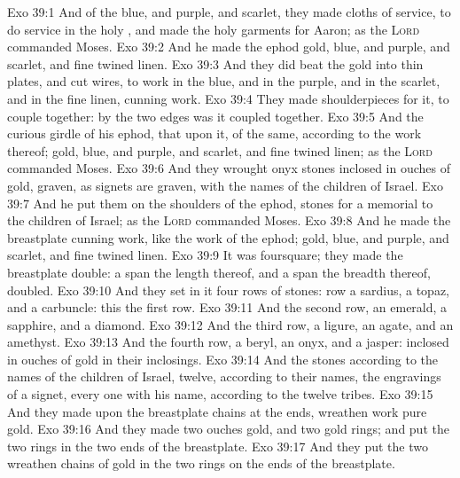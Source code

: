 \vs Exo 39:1 And of the blue, and purple, and scarlet, they made cloths of service, to do service in the holy , and made the holy garments for Aaron; as the \textsc{Lord} commanded Moses.
\vs Exo 39:2 And he made the ephod  gold, blue, and purple, and scarlet, and fine twined linen.
\vs Exo 39:3 And they did beat the gold into thin plates, and cut  wires, to work  in the blue, and in the purple, and in the scarlet, and in the fine linen,  cunning work.
\vs Exo 39:4 They made shoulderpieces for it, to couple  together: by the two edges was it coupled together.
\vs Exo 39:5 And the curious girdle of his ephod, that  upon it,  of the same, according to the work thereof;  gold, blue, and purple, and scarlet, and fine twined linen; as the \textsc{Lord} commanded Moses.
\vs Exo 39:6 And they wrought onyx stones inclosed in ouches of gold, graven, as signets are graven, with the names of the children of Israel.
\vs Exo 39:7 And he put them on the shoulders of the ephod,  stones for a memorial to the children of Israel; as the \textsc{Lord} commanded Moses.
\vs Exo 39:8 And he made the breastplate  cunning work, like the work of the ephod;  gold, blue, and purple, and scarlet, and fine twined linen.
\vs Exo 39:9 It was foursquare; they made the breastplate double: a span  the length thereof, and a span the breadth thereof,  doubled.
\vs Exo 39:10 And they set in it four rows of stones:  row  a sardius, a topaz, and a carbuncle: this  the first row.
\vs Exo 39:11 And the second row, an emerald, a sapphire, and a diamond.
\vs Exo 39:12 And the third row, a ligure, an agate, and an amethyst.
\vs Exo 39:13 And the fourth row, a beryl, an onyx, and a jasper:  inclosed in ouches of gold in their inclosings.
\vs Exo 39:14 And the stones  according to the names of the children of Israel, twelve, according to their names,  the engravings of a signet, every one with his name, according to the twelve tribes.
\vs Exo 39:15 And they made upon the breastplate chains at the ends,  wreathen work  pure gold.
\vs Exo 39:16 And they made two ouches  gold, and two gold rings; and put the two rings in the two ends of the breastplate.
\vs Exo 39:17 And they put the two wreathen chains of gold in the two rings on the ends of the breastplate.
